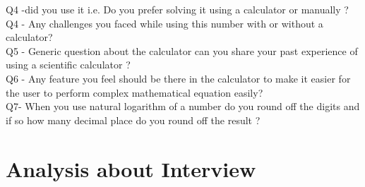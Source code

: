 \documentclass{article}
\begin{document}
Q4 -did you use it i.e. Do you prefer solving it using a calculator or manually ?\\
Q4 - Any challenges you faced while using this number with or without a calculator?\\
Q5 - Generic question about the calculator can you share your past experience of using a scientific calculator ?\\
Q6 - Any feature you feel should be there in the calculator to make it easier for the user to perform complex mathematical equation easily?\\
Q7- When you use natural logarithm of a number do you round off the digits and if so how many decimal place do you round off the result ? 


\section{Analysis about Interview}
\end{document}
